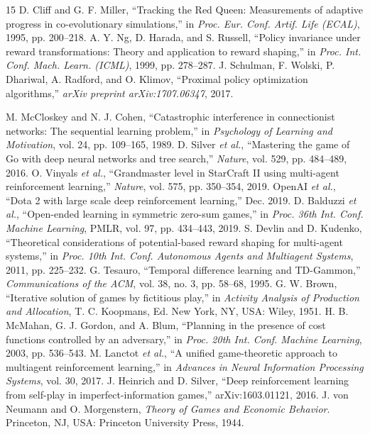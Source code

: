 \documentclass[conference]{IEEEtran}
\begin{document}
\begin{thebibliography}{15}
 D. Cliff and G. F. Miller, ``Tracking the Red Queen: Measurements of adaptive progress in co-evolutionary simulations,'' in \textit{Proc. Eur. Conf. Artif. Life (ECAL)}, 1995, pp. 200--218.
 A. Y. Ng, D. Harada, and S. Russell, ``Policy invariance under reward transformations: Theory and application to reward shaping,'' in \textit{Proc. Int. Conf. Mach. Learn. (ICML)}, 1999, pp. 278--287.
 J. Schulman, F. Wolski, P. Dhariwal, A. Radford, and O. Klimov, ``Proximal policy optimization algorithms,'' \textit{arXiv preprint arXiv:1707.06347}, 2017.

 M. McCloskey and N. J. Cohen, ``Catastrophic interference in connectionist networks: The sequential learning problem,'' in \textit{Psychology of Learning and Motivation}, vol. 24, pp. 109--165, 1989.
 D. Silver \textit{et al.}, ``Mastering the game of Go with deep neural networks and tree search,'' \textit{Nature}, vol. 529, pp. 484--489, 2016.
 O. Vinyals \textit{et al.}, ``Grandmaster level in StarCraft II using multi-agent reinforcement learning,'' \textit{Nature}, vol. 575, pp. 350--354, 2019.
 OpenAI \textit{et al.}, ``Dota 2 with large scale deep reinforcement learning,'' Dec. 2019.
 D. Balduzzi \textit{et al.}, ``Open-ended learning in symmetric zero-sum games,'' in \textit{Proc. 36th Int. Conf. Machine Learning}, PMLR, vol. 97, pp. 434--443, 2019.
 S. Devlin and D. Kudenko, ``Theoretical considerations of potential-based reward shaping for multi-agent systems,'' in \textit{Proc. 10th Int. Conf. Autonomous Agents and Multiagent Systems}, 2011, pp. 225--232.
 G. Tesauro, ``Temporal difference learning and TD-Gammon,'' \textit{Communications of the ACM}, vol. 38, no. 3, pp. 58--68, 1995.
 G. W. Brown, ``Iterative solution of games by fictitious play,'' in \textit{Activity Analysis of Production and Allocation}, T. C. Koopmans, Ed. New York, NY, USA: Wiley, 1951.
 H. B. McMahan, G. J. Gordon, and A. Blum, ``Planning in the presence of cost functions controlled by an adversary,'' in \textit{Proc. 20th Int. Conf. Machine Learning}, 2003, pp. 536--543.
 M. Lanctot \textit{et al.}, ``A unified game-theoretic approach to multiagent reinforcement learning,'' in \textit{Advances in Neural Information Processing Systems}, vol. 30, 2017.
 J. Heinrich and D. Silver, ``Deep reinforcement learning from self-play in imperfect-information games,'' arXiv:1603.01121, 2016.
 J. von Neumann and O. Morgenstern, \textit{Theory of Games and Economic Behavior}. Princeton, NJ, USA: Princeton University Press, 1944.
\end{thebibliography}
\end{document}
